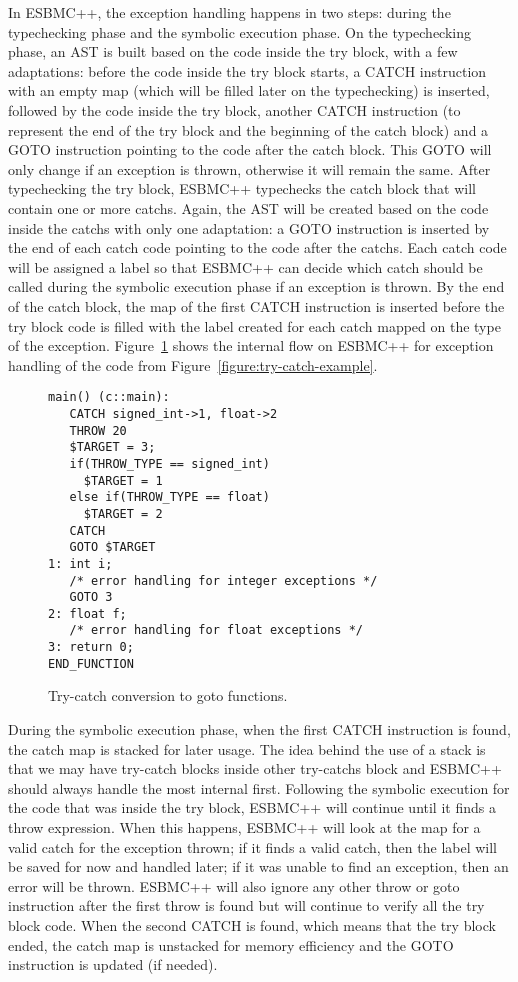 \documentclass[a4paper]{llncs}
\begin{document}
In ESBMC++, the exception handling happens in two steps:
during the typechecking phase and the symbolic execution phase.
On the typechecking phase, an AST is built based on the code
inside the try block, with a few adaptations: before the code
inside the try block starts, a CATCH instruction with an empty map
(which will be filled later on the typechecking) is inserted, followed by
the code inside the try block, another CATCH instruction
(to represent the end of the try block and the beginning of the
catch block) and a GOTO instruction pointing to the code after
the catch block. This GOTO will only change if an exception is thrown,
otherwise it will remain the same. After typechecking the try block,
ESBMC++ typechecks the catch block that will contain one or more catchs.
Again, the AST will be created based on the code inside the catchs
with only one adaptation: a GOTO instruction is inserted by the end of
each catch code pointing to the code after the catchs. Each catch code
will be assigned a label so that ESBMC++ can decide which catch should be called
during the symbolic execution phase if an exception is thrown. By the end
of the catch block, the map of the first CATCH instruction is
inserted before the try block code is filled with the label created
for each catch mapped on the type of the exception. Figure~\ref{figure:try-catch-goto}
shows the internal flow on ESBMC++ for exception handling of the code from
Figure~\ref{figure:try-catch-example}.

\begin{figure}[ht]
\centering
\begin{minipage}{1.0\textwidth}
\begin{lstlisting}
main() (c::main):
   CATCH signed_int->1, float->2
   THROW 20
   $TARGET = 3;
   if(THROW_TYPE == signed_int)
     $TARGET = 1
   else if(THROW_TYPE == float)
     $TARGET = 2
   CATCH
   GOTO $TARGET
1: int i;
   /* error handling for integer exceptions */
   GOTO 3
2: float f;
   /* error handling for float exceptions */
3: return 0;
END_FUNCTION
\end{lstlisting}
\end{minipage}
\caption{Try-catch conversion to goto functions.}
\label{figure:try-catch-goto}
\end{figure}

During the symbolic execution phase, when the first
CATCH instruction is found, the catch map is stacked
for later usage. The idea behind the use of a stack is
that we may have try-catch blocks inside other
try-catchs block and ESBMC++ should always handle
the most internal first. Following the symbolic execution
for the code that was inside the try block, ESBMC++ will continue
until it finds a throw expression. When this happens, ESBMC++ will
look at the map for a valid catch for the exception thrown; if it finds
a valid catch, then the label will be saved for now and handled later;
if it was unable to find an exception, then an error will be thrown.
ESBMC++ will also ignore any other throw or goto instruction after
the first throw is found but will continue to verify all the try
block code. When the second CATCH is found, which means that the try
block ended, the catch map is unstacked for memory efficiency
and the GOTO instruction is updated (if needed).
\end{document}

